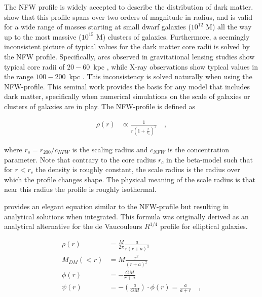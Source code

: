 \documentclass[MScProj_TLRH_ClusterEnergy.tex]{subfiles}
\begin{document}
The NFW profile is widely accepted to describe the distribution of dark matter.
\citet{1996ApJ...462..563N} show that this profile spans over two orders of 
magnitude in radius, and is valid for a wide range of masses starting at small 
dwarf galaxies ($10^{12}$ M\Sun) all the way up to the most massive ($10^{15}$
M\Sun) clusters of galaxies. Furthermore, a seemingly inconsistent picture of 
typical values for the dark matter core radii is solved by the NFW profile. 
Specifically, arcs observed in gravitational lensing studies show typical core 
radii of $20-60$~kpc \citep{1988ApJ...324L..37G}, while X-ray observations show 
typical values in the range $100-200$~kpc \citep{1991A&ARv...2..191F}. This 
inconsistency is solved naturally when using the NFW-profile. This seminal work 
provides the basis for any model that includes dark matter, specifically when 
numerical simulations on the scale of galaxies or clusters of galaxies are in play.
The NFW-profile is defined as

\begin{align}
    \rho(r) &\propto \frac{1}{r \left( 1 + \frac{r}{r_s} \right)^2}
        \label{eq:nfw} \quad ,
\end{align}

\noindent where $r_s = r_{200}/c_{NFW}$ is the scaling radius and $c_{NFW}$
is the concentration parameter. Note that contrary to the core
radius $r_c$ in the beta-model such that for $r<r_c$ the density
is roughly constant, the scale radius is the radius over which
the profile changes shape. The physical meaning of the scale radius is
that near this radius the profile is roughly isothermal. 

\citet{1990ApJ...356..359H} provides an elegant equation similar to the
NFW-profile but resulting in analytical solutions when integrated. This formula 
was originally derived as an analytical alternative for the de Vaucouleurs $R^{1/4}$
profile for elliptical galaxies. 

\begin{align}
    \rho(r) &= \frac{M}{2 \pi} \frac{a}{r(r+a)^3} \label{eq:hernquist} \\
    M_{DM}(<r) &= M \frac{r^2}{(r+a)^2} \label{eq:hernquist_mass} \\
    \phi(r) &= - \frac{GM}{r+a} \label{eq:hernquist_gravpot} \\
    \psi(r) &= - \left( \frac{a}{GM} \right) \cdot \phi(r) = \frac{a}{a+r} \label{eq:hernquist_psi} \quad ,
\end{align}
\end{document}
